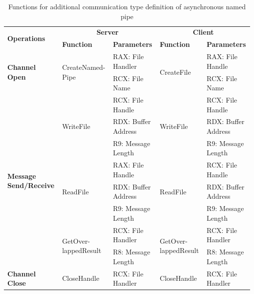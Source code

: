     \begin{table}[h]
        \centering
        \caption{Functions for additional communication type definition of asynchronous named pipe}
        \label{asynfunctions}
        \begin{tabular}{|l|l|l|l|l|}
            \hline
             \multirow{2}{*}{\textbf{Operations}} &
               \multicolumn{2}{c|}{\textbf{Server}} &
               \multicolumn{2}{c|}{\textbf{Client}} \\
             \cline{2-5}
              & \textbf{Function}& \textbf{Parameters} & \textbf{Function} & \textbf{Parameters}  \\
             \hline
             \multirow{2}{*}{\parbox{1.8cm}{\textbf{Channel Open}}}
             &\multirow{2}{*}{\parbox{2.5cm}{CreateNamed- Pipe}} &  RAX: File Handler & \multirow{2}{*}{CreateFile} &  RAX: File Handle\\
              \cline{3-3} \cline{5-5}
             &&  RCX: File Name &  &  RCX: File Name\\
            \hline
             \multirow{8}{*}{\parbox{1.8cm}{\textbf{Message Send/Receive}}}
             &\multirow{3}{*}{WriteFile} &  RCX: File Handle & \multirow{3}{*}{WriteFile} &  RCX: File Handle\\
              \cline{3-3} \cline{5-5}
             &&  RDX: Buffer Address &  &  RDX: Buffer Address\\
                           \cline{3-3} \cline{5-5}
             & &  R9: Message Length &  &  R9: Message Length\\
            \cline{2-5} 

             & \multirow{3}{*}{ReadFile}&  RAX: File Handle & \multirow{3}{*}{ReadFile} &  RCX: File Handle\\
              \cline{3-3} \cline{5-5}
              &&  RDX: Buffer Address &  &  RDX: Buffer Address\\
                           \cline{3-3} \cline{5-5}
             & &  R9: Message Length &  &  R9: Message Length\\
              \cline{2-5} 
             & \multirow{2}{*}{\parbox{2.5cm}{GetOver- lappedResult}}&  RCX: File Handler & \multirow{2}{*}{\parbox{2.5cm}{GetOver- lappedResult}} &  RCX: File Handler\\
              \cline{3-3} \cline{5-5}
             & &  R8: Message Length &  &  R8: Message Length\\
                         \hline
            \textbf{Channel Close} & CloseHandle &  RCX: File Handler & CloseHandle &  RCX: File Handler\\
            \hline
        \end{tabular}
    \end{table}
    
